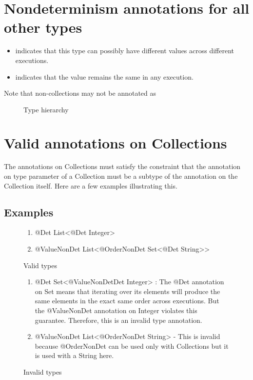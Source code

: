 \section{Nondeterminism annotations for all other types\label{nondeterminism-annotations-elements}}

\begin{itemize}
\item
   indicates
  that this type can possibly have different values across different executions.
 \item
   indicates that
  the value remains the same in any execution.
\end{itemize}

Note that non-collections may not be annotated as 

\begin{figure}
	\begin{center}
	\end{center}
	\caption{Type hierarchy}
	\label{fig-ihierarchy}
\end{figure}

\section{Valid annotations on Collections\label{type-validity}}
The annotations on Collections must satisfy the constraint that the annotation on type parameter of a Collection must be a
subtype of the annotation on the Collection itself. Here are a few examples illustrating this.

\subsection{Examples\label{validity-examples}}
\begin{figure}[h]\caption{Valid types}
	\begin{enumerate}
		\item @Det List<@Det Integer>
		\item @ValueNonDet List<@OrderNonDet Set<@Det String>>
	\end{enumerate}
\end{figure}

\begin{figure}[h]\caption{Invalid types}
	\begin{enumerate}
		\item @Det Set<@ValueNonDetDet Integer> : The @Det annotation on Set means that iterating over its elements will produce the same elements in the exact same order across executions. But the @ValueNonDet annotation on Integer violates this guarantee. Therefore, this is an invalid type annotation.
		\item @ValueNonDet List<@OrderNonDet String> - This is invalid because @OrderNonDet can be used only with Collections but it is used with a String here.
	\end{enumerate}
\end{figure}

